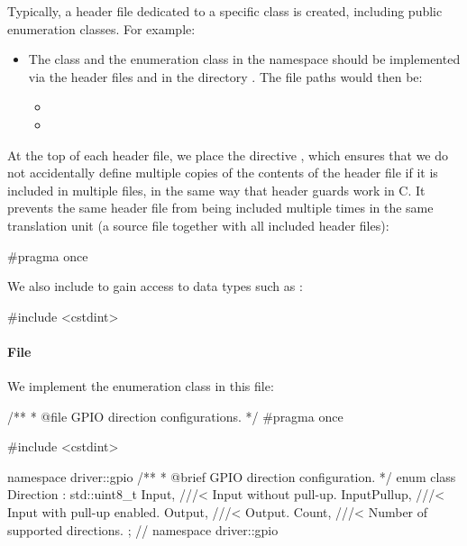 Typically, a header file dedicated to a specific class is created, including public enumeration
classes. For example:
\begin{itemize}
  \item The class  and the enumeration class  in the namespace
     should be implemented via the header files  and
     in the directory . The file paths would then be:
  \begin{itemize}
    \item {}
    \item {}
  \end{itemize}
\end{itemize}
At the top of each header file, we place the directive , which ensures that we
do not accidentally define multiple copies of the contents of the header file if it is included in
multiple files, in the same way that header guards work in C. It prevents the same header file from
being included multiple times in the same translation unit (a source file together with all
included header files):

\begin{cppcode}
#pragma once
\end{cppcode}

\noindent We also include  to gain access to data types such as
:

\begin{cppcode}
#include <cstdint>
\end{cppcode}

\paragraph{File }
We implement the enumeration class  in this file:

\begin{cppcode}
/**
 * @file GPIO direction configurations.
 */
#pragma once

#include <cstdint>

namespace driver::gpio
{
/**
 * @brief GPIO direction configuration.
 */
enum class Direction : std::uint8_t
{
    Input,       ///< Input without pull-up.
    InputPullup, ///< Input with pull-up enabled.
    Output,      ///< Output.
    Count,       ///< Number of supported directions.
};
} // namespace driver::gpio
\end{cppcode}

